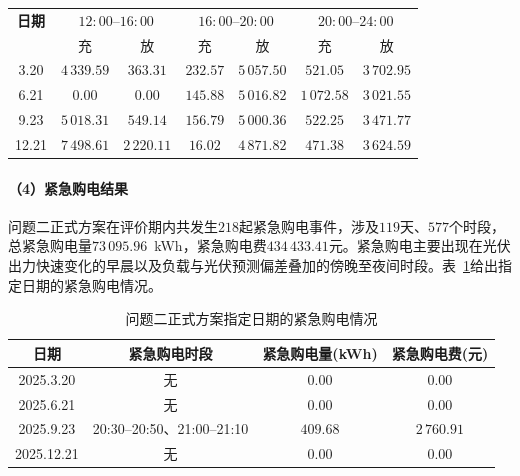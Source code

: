 \documentclass[12pt,a4paper]{ctexart}
\theoremstyle{definition}
\theoremstyle{plain}
\theoremstyle{remark}
\begin{document}
\begin{table}[H]
\centering
{}
\begin{tabular}{c|cc|cc|cc}
\toprule
\textbf{日期} & \multicolumn{2}{c|}{$12{:}00$--$16{:}00$} & \multicolumn{2}{c|}{$16{:}00$--$20{:}00$} & \multicolumn{2}{c}{$20{:}00$--$24{:}00$} \\
 & 充 & 放 & 充 & 放 & 充 & 放 \\
\midrule
3.20 & $4\,339.59$ & $363.31$ & $232.57$ & $5\,057.50$ & $521.05$ & $3\,702.95$ \\
6.21 & $0.00$ & $0.00$ & $145.88$ & $5\,016.82$ & $1\,072.58$ & $3\,021.55$ \\
9.23 & $5\,018.31$ & $549.14$ & $156.79$ & $5\,000.36$ & $522.25$ & $3\,471.77$ \\
12.21 & $7\,498.61$ & $2\,220.11$ & $16.02$ & $4\,871.82$ & $471.38$ & $3\,624.59$ \\
\bottomrule
\end{tabular}
\end{table}

\paragraph{（4）紧急购电结果}

问题二正式方案在评价期内共发生$218$起紧急购电事件，涉及$119$天、$577$个时段，总紧急购电量$73\,095.96$~kWh，紧急购电费$434\,433.41$元。紧急购电主要出现在光伏出力快速变化的早晨以及负载与光伏预测偏差叠加的傍晚至夜间时段。表~\ref{tab:q2_emergency_sample}给出指定日期的紧急购电情况。

\begin{table}[H]
\centering
\caption{问题二正式方案指定日期的紧急购电情况}
\label{tab:q2_emergency_sample}
\begin{tabular}{cccc}
\toprule
\textbf{日期} & \textbf{紧急购电时段} & \textbf{紧急购电量(kWh)} & \textbf{紧急购电费(元)} \\
\midrule
2025.3.20  & 无 & $0.00$ & $0.00$ \\
2025.6.21  & 无 & $0.00$ & $0.00$ \\
2025.9.23  & 20:30--20:50、21:00--21:10 & $409.68$ & $2\,760.91$ \\
2025.12.21 & 无 & $0.00$ & $0.00$ \\
\bottomrule
\end{tabular}
\end{table}

\end{document}

